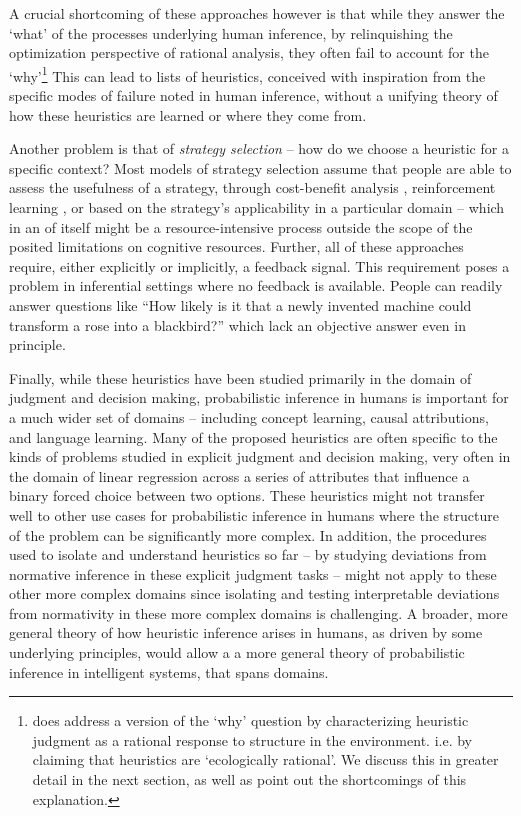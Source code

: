 A crucial shortcoming of these approaches however is that while they answer the `what' of the processes underlying human inference, by relinquishing the optimization perspective of rational analysis, they often fail to account for the `why'\footnote{\citet{gigerenzer2008heuristics} does address a version of the `why' question by characterizing heuristic judgment as a rational response to structure in the environment. i.e. by claiming that heuristics are `ecologically rational'. We discuss this in greater detail in the next section, as well as point out the shortcomings of this explanation.} This can lead to lists of heuristics, conceived with inspiration from the specific modes of failure noted in human inference, without a unifying theory of how these heuristics are learned or where they come from. 

Another problem is that of \emph{strategy selection} \citep{gigerenzer2008heuristics, marewski2014strategy} -- how do we choose a heuristic for a specific context? Most models of strategy selection assume that people are able to assess the usefulness of a strategy, through cost-benefit analysis \citep{johnson85, beach1978contingency, lieder2017strategy}, reinforcement learning \citep{erev05, rieskamp06}, or based on the strategy's applicability in a particular domain \citep{marewski2011cognitive, schulz2016simple} -- which in an of itself might be a resource-intensive process outside the scope of the posited limitations on cognitive resources. Further, all of these approaches require, either explicitly or implicitly, a feedback signal. This requirement poses a problem in inferential settings where no feedback is available. People can readily answer questions like ``How likely is it that a newly invented machine could transform a rose into a blackbird?'' \citep{Griffiths15} which lack an objective answer even in principle. 

Finally, while these heuristics have been studied primarily in the domain of judgment and decision making, probabilistic inference in humans is important for a much wider set of domains -- including concept learning, causal attributions, and language learning. Many of the proposed heuristics are often specific to the kinds of problems studied in explicit judgment and decision making, very often in the domain of linear regression across a series of attributes that influence a binary forced choice between two options. These heuristics might not transfer well to other use cases for probabilistic inference in humans where the structure of the problem can be significantly more complex. In addition, the procedures used to isolate and understand heuristics so far -- by studying deviations from normative inference in these explicit judgment tasks -- might not apply to these other more complex domains since isolating and testing interpretable deviations from normativity in these more complex domains is challenging. A broader, more general theory of how heuristic inference arises in humans, as driven by some underlying principles, would allow a a more general theory of probabilistic inference in intelligent systems, that spans domains.

